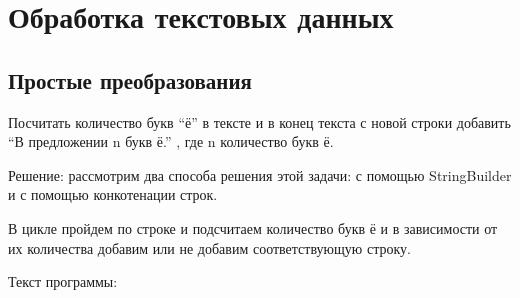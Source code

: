 \section{Обработка текстовых данных}

\subsection{Простые преобразования}

Посчитать количество букв “ё” в тексте и в конец текста с новой строки
добавить “В предложении n букв ё.” , где n количество букв ё.

Решение: рассмотрим два способа решения этой задачи: с помощью
StringBuilder и с помощью конкотенации строк.

В цикле пройдем по строке и подсчитаем количество букв ё и в
зависимости от их количества добавим или не добавим соответствующую
строку.

Текст программы:


            
                
                
            

